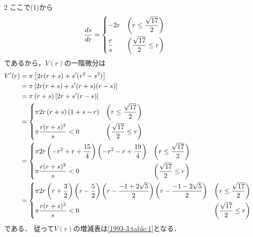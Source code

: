 \documentclass[../../main.tex]{subfiles}
\begin{document}
\begin{multicols}{2}
  ここで(1)から
  \begin{align}
    \dfrac{ds}{dr} & =
    \begin{dcases}
      -2r         & \left(r \le \dfrac{\sqrt{17}}{2}\right)  \\
      \dfrac{r}{s} & \left(\dfrac{\sqrt{17}}{2} \le r \right)
    \end{dcases}
  \end{align}
  であるから，$V(r)$の一階微分は
  \begin{align}
    V'(r)
    & = \pi \left[ 2r(r+s)+s'(r^2-s^2) \right]                                                                                                                                                                                                                                     \\
    & = \pi \left[ 2r(r+s)+s'(r+s)(r-s) \right]                                                                                                                                                                                                                                    \\
    & = \pi \left(r+s\right)\left[ 2r+s'(r-s) \right]                                                                                                                                                                                                                              \\
    & =
    \begin{dcases}
      \pi 2r \left(r+s\right)\left( 1 + s - r \right) & \left(r \le \dfrac{\sqrt{17}}{2}\right)  \\
      \pi \dfrac{r(r+s)^2}{s} < 0                      & \left(\dfrac{\sqrt{17}}{2} \le r \right)
    \end{dcases}                                                                                                                                                    \\
    & =
    \begin{dcases}
      \pi 2r\left(-r^2+r+\dfrac{15}{4}\right)\left(-r^2-r+\dfrac{19}{4}\right) & \left(r \le \dfrac{\sqrt{17}}{2}\right)  \\
      \pi \dfrac{r(r+s)^2}{s} < 0                                             & \left(\dfrac{\sqrt{17}}{2} \le r \right)
    \end{dcases}                                                                                                                             \\
    & =
    \begin{dcases}
      \pi 2r\left(r+\dfrac{3}{2}\right)\left(r-\dfrac{5}{2}\right)\left(r-\dfrac{-1+2\sqrt{5}}{2}\right)\left(r-\dfrac{-1-2\sqrt{5}}{2}\right) & \left(r \le \dfrac{\sqrt{17}}{2}\right)  \\
      \pi \dfrac{r(r+s)^2}{s} < 0                                                                                                           & \left(\dfrac{\sqrt{17}}{2} \le r \right)
    \end{dcases}
  \end{align}
  である．
  従って$V(r)$の増減表は\cref{1993-3:table:1}となる．


\end{multicols}
\end{document}
